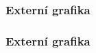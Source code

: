 \subsubsection{Externí grafika}
\begin{frame}
	\frametitle{Externí grafika}
	\UnderConstruction
\end{frame}

\endinput
